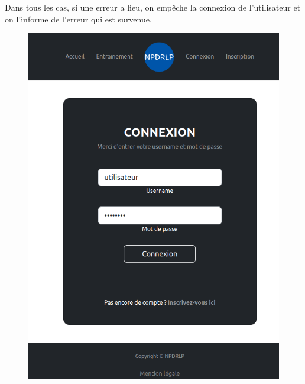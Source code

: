 \documentclass[12pt,french]{article}
\begin{document}
Dans tous les cas, si une erreur a lieu, on empêche la connexion de l'utilisateur et on l'informe de l'erreur qui est survenue.

\begin{figure}[H]
	\centering
	\begin{minipage}{.5\textwidth}
		\centering
		\includegraphics[scale=0.25]{connec1.png}
	\end{minipage}%
	\begin{minipage}{.5\textwidth}
		\centering

\end{minipage}
\end{figure}
\end{document}
